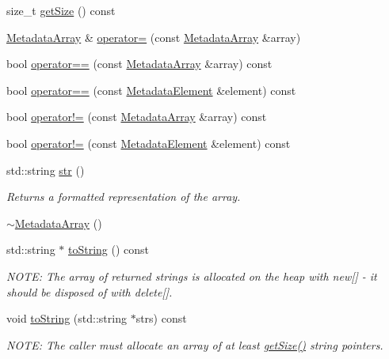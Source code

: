 \begin{DoxyCompactItemize}
\item 
size\_\-t \hyperlink{classBUSBOY_1_1MetadataArray_a41adb6cde8e1adf9a85813dfac0611d4}{getSize} () const 
\item 
\hyperlink{classBUSBOY_1_1MetadataArray}{MetadataArray} \& \hyperlink{classBUSBOY_1_1MetadataArray_a59b946f07da7ab0ba83996a53b027561}{operator=} (const \hyperlink{classBUSBOY_1_1MetadataArray}{MetadataArray} \&array)
\item 
bool \hyperlink{classBUSBOY_1_1MetadataArray_a6105a539099289a76db6524c926ea551}{operator==} (const \hyperlink{classBUSBOY_1_1MetadataArray}{MetadataArray} \&array) const 
\item 
bool \hyperlink{classBUSBOY_1_1MetadataArray_a55817c939be35da0f3ef10c164483169}{operator==} (const \hyperlink{classBUSBOY_1_1MetadataElement}{MetadataElement} \&element) const 
\item 
bool \hyperlink{classBUSBOY_1_1MetadataArray_a62365009f5370b749639004ff5c93096}{operator!=} (const \hyperlink{classBUSBOY_1_1MetadataArray}{MetadataArray} \&array) const 
\item 
bool \hyperlink{classBUSBOY_1_1MetadataArray_a781093b168f59ed77d378ead7cb3cc37}{operator!=} (const \hyperlink{classBUSBOY_1_1MetadataElement}{MetadataElement} \&element) const 
\item 
std::string \hyperlink{classBUSBOY_1_1MetadataArray_afc38895092e35b17bee29a1f4c3e1eb6}{str} ()
\begin{DoxyCompactList}\small\item\em Returns a formatted representation of the array. \item\end{DoxyCompactList}\item 
\hyperlink{classBUSBOY_1_1MetadataArray_aff7e5f64948bd6a2e20e5d2f4b1c1ccf}{$\sim$MetadataArray} ()
\item 
std::string $\ast$ \hyperlink{classBUSBOY_1_1MetadataArray_adb7b1b79f1846ef2afbb9a5d86e9f49d}{toString} () const 
\begin{DoxyCompactList}\small\item\em NOTE: The array of returned strings is allocated on the heap with new\mbox{[}\mbox{]} -\/ it should be disposed of with delete\mbox{[}\mbox{]}. \item\end{DoxyCompactList}\item 
void \hyperlink{classBUSBOY_1_1MetadataArray_a1884d698f185fa233e9cb72c130c4a64}{toString} (std::string $\ast$strs) const 
\begin{DoxyCompactList}\small\item\em NOTE: The caller must allocate an array of at least \hyperlink{classBUSBOY_1_1MetadataArray_a41adb6cde8e1adf9a85813dfac0611d4}{getSize()} string pointers. \item\end{DoxyCompactList}\end{DoxyCompactItemize}
